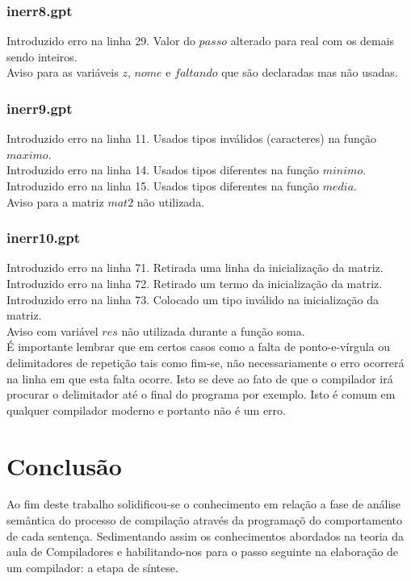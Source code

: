 \documentclass[a4paper,12pt]{report}
\begin{document}
\subsubsection{inerr8.gpt}

Introduzido erro na linha 29. Valor do $passo$ alterado para real com os demais sendo inteiros. \\
Aviso para as vari\'aveis $z$, $nome$ e $faltando$ que s\~ao declaradas mas n\~ao usadas. 

\subsubsection{inerr9.gpt}

Introduzido erro na linha 11. Usados tipos inv\'alidos (caracteres) na fun\c{c}\~ao $maximo$.\\
Introduzido erro na linha 14. Usados tipos diferentes na fun\c{c}\~ao $minimo$.\\
Introduzido erro na linha 15. Usados tipos diferentes na fun\c{c}\~ao $media$. \\
Aviso para a matriz $mat2$ n\~ao utilizada.

\subsubsection{inerr10.gpt}

Introduzido erro na linha 71. Retirada uma linha da inicializa\c{c}\~ao da matriz.\\
Introduzido erro na linha 72. Retirado um termo da inicializa\c{c}\~ao da matriz. \\
Introduzido erro na linha 73. Colocado um tipo inv\'alido na inicializa\c{c}\~ao da matriz. \\
Aviso com vari\'avel $res$ n\~ao utilizada durante a fun\c{c}\~ao soma. \\

\'E importante lembrar que em certos casos como a falta de ponto-e-v\'irgula ou delimitadores
de repeti\c{c}\~ao tais 
como fim-se, n\~ao necessariamente o erro ocorrer\'a na linha em que esta falta ocorre. 
Isto se deve ao fato de que o compilador 
ir\'a procurar o delimitador at\'e o final do programa por exemplo.
Isto \'e comum em qualquer compilador moderno e portanto n\~ao \'e um erro.

\section{Conclus\~ao}

Ao fim deste trabalho solidificou-se o conhecimento em rela\c{c}\~ao a fase de 
an\'alise sem\^antica do processo de compila\c{c}\~ao atrav\'es da programa\c{c}\~o 
do comportamento de cada senten\c{c}a. Sedimentando assim os conhecimentos abordados
na teoria da aula de Compiladores e habilitando-nos para o passo seguinte na 
elabora\c{c}\~ao de um compilador: a etapa de s\'intese.
\end{document}
